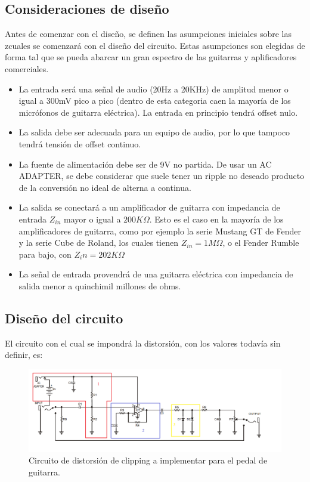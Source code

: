 \documentclass[../../main.tex]{subfiles}
\begin{document}
\subsection{Consideraciones de dise\~no} \label{ssec:ej5_consideraciones_disenio}
Antes de comenzar con el diseño, se definen las asumpciones iniciales sobre las zcuales se comenzará con el diseño del circuito. Estas asumpciones son elegidas de forma tal que se pueda abarcar un gran espectro de las guitarras y aplificadores comerciales.\par
\begin{itemize}
	\item La entrada ser\'a una señal de audio (20Hz a 20KHz) de amplitud menor o igual a 300mV pico a pico (dentro de esta categoria caen la mayor\'ia de los micr\'ofonos de guitarra el\'ectrica). La entrada en principio tendrá offset nulo.
	\item La salida debe ser adecuada para un equipo de audio, por lo que tampoco tendrá tensión de offset continuo.
	\item La fuente de alimentaci\'on debe ser de 9V no partida. De usar un AC ADAPTER, se debe considerar que suele tener un ripple no deseado producto de la conversi\'on no ideal de alterna a continua.
	\item La salida se conectar\'a a un amplificador de guitarra con impedancia de entrada $Z_{in}$ mayor o igual a $200K\Omega$. Esto es el caso en la mayor\'ia de los amplificadores de guitarra, como por ejemplo la serie Mustang GT de Fender y la serie Cube de Roland, los cuales tienen $Z_{in} = 1M\Omega$, o el Fender Rumble para bajo, con $Z_in = 202K\Omega$ 
	\item La se\~nal de entrada provendr\'a de una guitarra el\'ectrica con impedancia de salida menor a quinchimil millones de ohms.	
\end{itemize}


\subsection{Dise\~no del circuito}
\label{disenoCirc}
El circuito con el cual se impondrá la distorsión, con los valores todavía sin definir, es:

\begin{figure}[H]	%
	\centering
	\includegraphics[scale=0.6]{imagenes/Circuito_consigna.png}
	\caption{Circuito de distorsión de clipping a implementar para el pedal de guitarra.}
	\label{fig:ej5_Circuito_consigna}
\end{figure}
\end{document}
